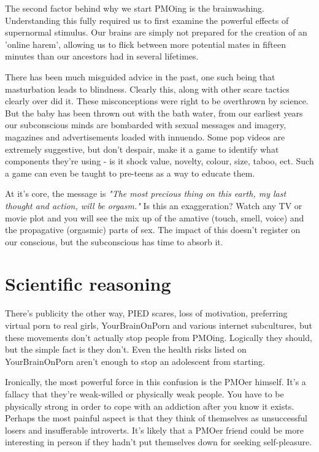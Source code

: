 \documentclass[easypeasy.tex]{subfiles}
\begin{document}
The second factor behind why we start PMOing is the brainwashing. Understanding this fully required us to first examine the powerful effects of supernormal stimulus. Our brains are simply not prepared for the creation of an 'online harem', allowing us to flick between more potential mates in fifteen minutes than our ancestors had in several lifetimes.

There has been much misguided advice in the past, one such being that masturbation leads to blindness. Clearly this, along with other scare tactics clearly over did it. These misconceptions were right to be overthrown by science. But the baby has been thrown out with the bath water, from our earliest years our subconscious minds are bombarded with sexual messages and imagery, magazines and advertisements loaded with innuendo. Some pop videos are extremely suggestive, but don't despair, make it a game to identify what components they're using - is it shock value, novelty, colour, size, taboo, ect. Such a game can even be taught to pre-teens as a way to educate them.

At it's core, the message is \textit{"The most precious thing on this earth, my last thought and action, will be orgasm."} Is this an exaggeration? Watch any TV or movie plot and you will see the mix up of the amative (touch, smell, voice) and the propagative (orgasmic) parts of sex. The impact of this doesn't register on our conscious, but the subconscious has time to absorb it.

\section{Scientific reasoning}
There's publicity the other way, PIED scares, loss of motivation, preferring virtual porn to real girls, YourBrainOnPorn and various internet subcultures, but these movements don't actually stop people from PMOing. Logically they should, but the simple fact is they don't. Even the health risks listed on YourBrainOnPorn aren't enough to stop an adolescent from starting.

Ironically, the most powerful force in this confusion is the PMOer himself. It's a fallacy that they're weak-willed or physically weak people. You have to be physically strong in order to cope with an addiction after you know it exists. Perhaps the most painful aspect is that they think of themselves as unsuccessful losers and insufferable introverts. It's likely that a PMOer friend could be more interesting in person if they hadn't put themselves down for seeking self-pleasure.
\end{document}
